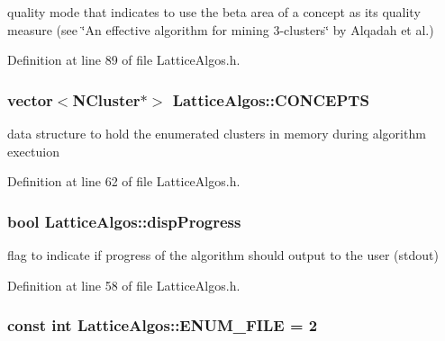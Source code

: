 quality mode that indicates to use the beta area of a concept as its quality measure (see \char`\"{}An effective algorithm for mining 3-\/clusters\char`\"{} by Alqadah et al.) 



Definition at line 89 of file LatticeAlgos.h.

\hypertarget{class_lattice_algos_a006fbb44cdb89ab949bc9f47ed20a6d3}{
\subsubsection[{CONCEPTS}]{\setlength{\rightskip}{0pt plus 5cm}vector$<${\bf NCluster}$\ast$$>$ {\bf LatticeAlgos::CONCEPTS}}}
\label{class_lattice_algos_a006fbb44cdb89ab949bc9f47ed20a6d3}


data structure to hold the enumerated clusters in memory during algorithm exectuion 



Definition at line 62 of file LatticeAlgos.h.

\hypertarget{class_lattice_algos_a7c599d38a3a66b926d7345153ca2e93c}{
\subsubsection[{dispProgress}]{\setlength{\rightskip}{0pt plus 5cm}bool {\bf LatticeAlgos::dispProgress}}}
\label{class_lattice_algos_a7c599d38a3a66b926d7345153ca2e93c}


flag to indicate if progress of the algorithm should output to the user (stdout) 



Definition at line 58 of file LatticeAlgos.h.

\hypertarget{class_lattice_algos_a824804a33640782553f2b399b28fde13}{
\subsubsection[{ENUM\_\-FILE}]{\setlength{\rightskip}{0pt plus 5cm}const int {\bf LatticeAlgos::ENUM\_\-FILE} = 2}}
\label{class_lattice_algos_a824804a33640782553f2b399b28fde13}


